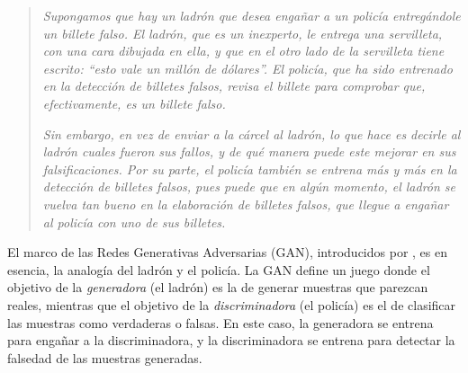 {{{%
\begin{quotation}
    \textit{Supongamos que hay un ladrón que desea engañar a un policía entregándole un billete falso. El ladrón, que es un inexperto, le entrega una servilleta, con una cara dibujada en ella, y que en el otro lado de la servilleta tiene escrito: ``\emph{esto vale un millón de dólares}''. El policía, que ha sido entrenado en la detección de billetes falsos, revisa el billete para comprobar que, efectivamente, es un billete falso.}

    \textit{Sin embargo, en vez de enviar a la cárcel al ladrón, lo que hace es decirle al ladrón cuales fueron sus fallos, y de qué manera puede este mejorar en sus falsificaciones. Por su parte, el policía también se entrena más y más en la detección de billetes falsos, pues puede que en algún momento, el ladrón se vuelva tan bueno en la elaboración de billetes falsos, que llegue a engañar al policía con uno de sus billetes.}
\end{quotation}

El marco de las Redes Generativas Adversarias (GAN), introducidos por \cite{goodfellow2014generative}, es en esencia, la analogía del ladrón y el policía.
La GAN define un juego donde el objetivo de la \emph{generadora} (el ladrón) es la de generar muestras que parezcan reales, mientras que el objetivo de la \emph{discriminadora} (el policía) es el de clasificar las muestras como verdaderas o falsas.
En este caso, la generadora se entrena para engañar a la discriminadora, y la discriminadora se entrena para detectar la falsedad de las muestras generadas.

}}}
